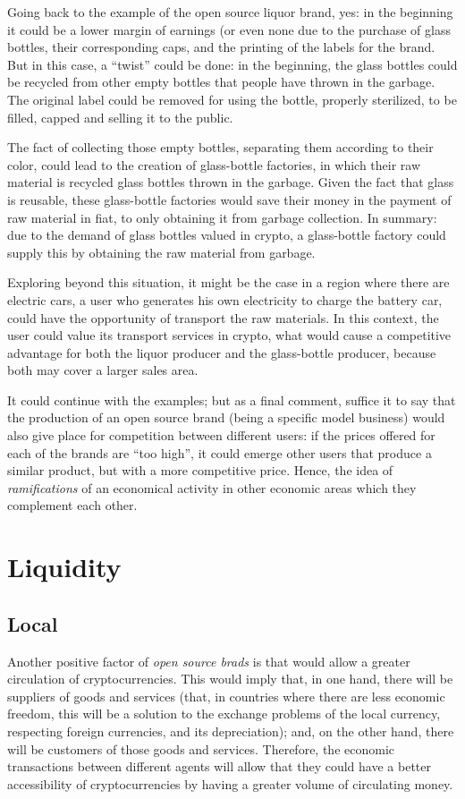 \documentclass[12pt,a4paper]{article}
\begin{document}
Going back to the example of the open source liquor brand, yes: in the beginning it could be a lower margin of earnings (or even none due to the purchase of glass bottles, their corresponding caps,  and the printing of the labels for the brand. But in this case, a “twist” could be done: in the beginning, the glass bottles could be recycled from other empty bottles that people have thrown in the garbage. The original label could be removed for using the bottle, properly sterilized, to be filled, capped and selling it to the public.

The fact of collecting those empty bottles, separating them according to their color, could lead to the creation of glass-bottle factories, in which their raw material is recycled glass bottles thrown in the garbage. Given the fact that glass is reusable, these glass-bottle factories would save their money in the payment of raw material in fiat, to only obtaining it from garbage collection. In summary: due to the demand of glass bottles valued in crypto, a glass-bottle factory could supply this by obtaining the raw material from garbage.

Exploring beyond this situation, it might be the case in a region where there are electric cars, a user who generates his own electricity to charge the battery car, could have the opportunity of transport the raw materials. In this context, the user could value its transport services in crypto, what would cause a competitive advantage for both the liquor producer and the glass-bottle producer, because both may cover a larger sales area.

It could continue with the examples; but as a final comment, suffice it to say that the production of an open source brand (being a specific model business) would also give place for competition between different users: if the prices offered for each of the brands are “too high”, it could emerge other users that produce a similar product, but with a more competitive price. Hence, the idea of \textit{ramifications} of an economical activity in other economic areas which they complement each other.

\section{Liquidity}
\subsection{Local}
Another positive factor of \textit{open source brads} is that would allow a greater circulation of cryptocurrencies. This would imply that, in one hand, there will be suppliers of goods and services (that, in countries where there are less economic freedom, this will be a solution to the exchange problems of the local currency, respecting foreign currencies, and its depreciation); and, on the other hand, there will be customers of those goods and services. Therefore, the economic transactions between different agents will allow that they could have a better accessibility of cryptocurrencies by having a greater volume of circulating money.
\end{document}
